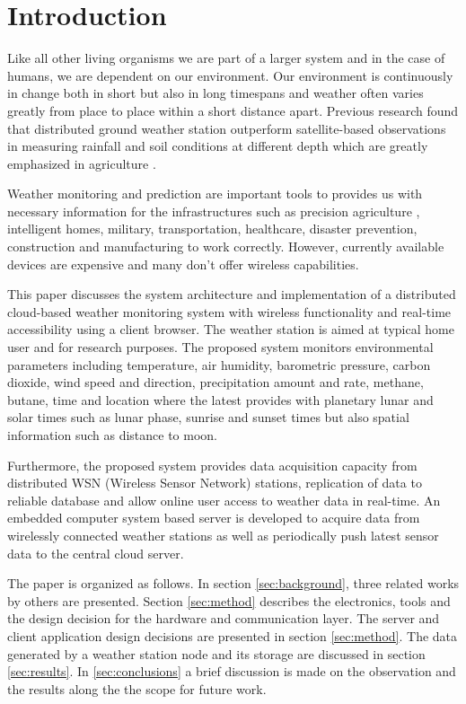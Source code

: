 \section{Introduction}
\label{sec:introduction}
Like all other living organisms we are part of a larger system and in the case of
humans, we are dependent on our environment. Our environment is continuously in change
both in short but also in long timespans and weather often varies greatly from
place to place within a short distance apart. Previous research found that
distributed ground weather station outperform satellite-based observations
in measuring rainfall and soil conditions at different depth which are greatly
emphasized in agriculture \cite{Mendelsohn2007}.

Weather monitoring and prediction are important tools to provides us with necessary information for the
infrastructures such as precision agriculture \cite{6878963}, intelligent homes,
military, transportation, healthcare, disaster prevention, construction and manufacturing to work correctly.
However, currently available devices are expensive and many don't offer wireless capabilities.

This paper discusses the system architecture and implementation of a distributed cloud-based weather monitoring system with wireless functionality and
real-time accessibility using a client browser. The weather station is aimed at typical home user and for research purposes. The proposed system monitors environmental parameters including
temperature, air humidity, barometric pressure, carbon dioxide, wind speed and direction, precipitation amount
and rate, methane, butane, time and location where the latest provides with planetary lunar and solar times such
as lunar phase, sunrise and sunset times but also spatial information such as distance to moon.

Furthermore, the proposed system provides data acquisition capacity from distributed WSN (Wireless Sensor Network) stations,
replication of data to reliable database and allow online user access to weather data in real-time.
An embedded computer system based server is developed to acquire data from wirelessly connected weather
stations as well as periodically push latest sensor data to the central cloud server.

The paper is organized as follows. In section \ref{sec:background},
three related works by others are presented. Section \ref{sec:method} describes the electronics, tools and the design decision for the hardware and communication layer. The server and client application design decisions are presented in section \ref{sec:method}.
The data generated by a weather station node and its storage are discussed in section \ref{sec:results}.
In \ref{sec:conclusions} a brief discussion is made on the observation and the results along the the scope for future work.
